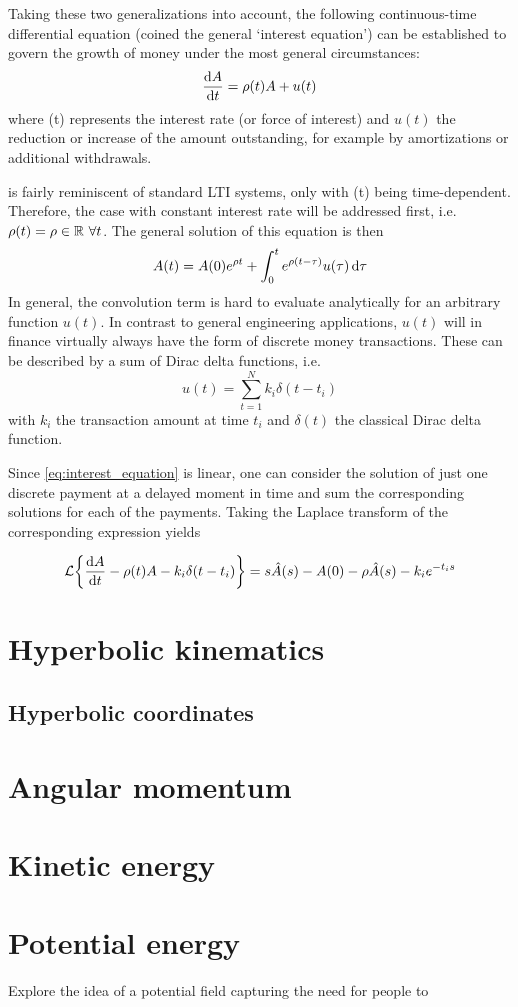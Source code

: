 Taking these two generalizations into account, the following continuous-time differential equation (coined the general `interest equation') can be established to govern the growth of money under the most general circumstances:
\begin{equation}
    \dv{\ensuremath{A}}{t} = \rho(t) A + u(t)
    \label{eq:interest_equation}
\end{equation}
where \hanv(t) represents the interest rate (or force of interest) and $u(t)$ the reduction or increase of the amount outstanding, for example by amortizations or additional withdrawals. 

 is fairly reminiscent of standard LTI systems, only with \hanv(t) being time-dependent. Therefore, the case with constant interest rate will be addressed first, i.e. $\rho(t) = \rho \in \mathbb{R} \ \forall t$. The general solution of this equation is then
\begin{equation}
    A(t) = A(0)e^{\rho t} + \int_0^t e^{\rho (t - \tau)} u(\tau )\dd{\tau}
\end{equation}
In general, the convolution term is hard to evaluate analytically for an arbitrary function $u(t)$. In contrast to general engineering applications, $u(t)$ will in finance virtually always have the form of discrete money transactions. These can be described by a sum of Dirac delta functions, i.e. 
\begin{equation}
    u(t) = \sum^N_{t=1} k_i \delta(t - t_i)
\end{equation}
with $k_i$ the transaction amount at time $t_i$ and $\delta(t)$ the classical Dirac delta function.

Since \cref{eq:interest_equation} is linear, one can consider the solution of just one discrete payment at a delayed moment in time and sum the corresponding solutions for each of the payments. Taking the Laplace transform of the corresponding expression yields

\begin{equation}
    \mathcal{L} 
    \qty{\dv{\amnt}{t} - \hanv(t) \amnt - k_i \delta(t - t_i)} = s\hat{\amnt}(s) - A(0) - \hanv\hat{\amnt}(s) - k_i e^{-t_i s}
\end{equation}

\section{Hyperbolic kinematics}
\subsection{Hyperbolic coordinates}

\section{Angular momentum}

\section{Kinetic energy}

\section{Potential energy}
Explore the idea of a potential field capturing the need for people to
